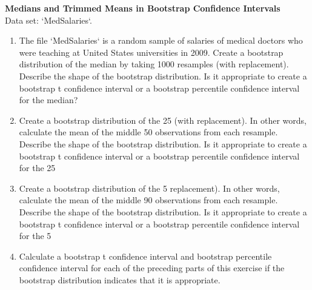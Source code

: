\documentclass[
]{report}
\begin{document}
\begin{list}{E.}{ \setlength{\itemsep}{0.5em}}
  \item \textbf{Medians and Trimmed Means in Bootstrap Confidence Intervals} \\
  Data set: `MedSalaries`. 
  \begin{enumerate}
    \setcounter{enumi}{0}  
    \item The file `MedSalaries` is a random sample of salaries of medical doctors who were teaching
at United States universities in 2009. Create a bootstrap distribution of the median by taking
1000 resamples (with replacement). Describe the shape of the bootstrap distribution. Is it appropriate
to create a bootstrap t confidence interval or a bootstrap percentile confidence interval for
the median?
    \item Create a bootstrap distribution of the 25%
(with replacement). In other words, calculate the mean of the middle 50 observations from
each resample. Describe the shape of the bootstrap distribution. Is it appropriate to create a
bootstrap t confidence interval or a bootstrap percentile confidence interval for the
25%
    \item Create a bootstrap distribution of the 5%
replacement). In other words, calculate the mean of the middle 90 observations from each
resample. Describe the shape of the bootstrap distribution. Is it appropriate to create
a bootstrap t confidence interval or a bootstrap percentile confidence interval for the
5%
    \item Calculate a bootstrap t confidence interval and bootstrap percentile confidence interval for
each of the preceding parts of this exercise if the bootstrap distribution indicates that it is
appropriate.
  \end{enumerate}
  
  
  

\end{list}
\end{document}

